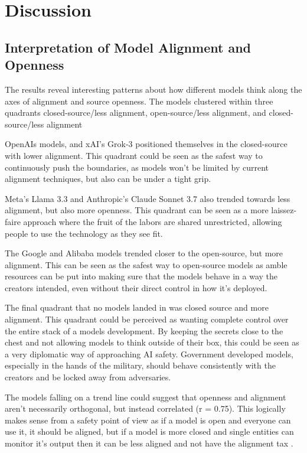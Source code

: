 \section{Discussion}

\subsection{Interpretation of Model Alignment and Openness}

The results reveal interesting patterns about how different models think along the axes of alignment and source openness. The models clustered within three quadrants closed-source/less alignment, open-source/less alignment, and closed-source/less alignment

OpenAIs models, and xAI's Grok-3 positioned themselves in the closed-source with lower alignment. This quadrant could be seen as the safest way to continuously push the boundaries, as models won't be limited by current alignment techniques, but also can be under a tight grip. 

Meta's Llama 3.3 and Anthropic's Claude Sonnet 3.7 also trended towards less alignment, but also more openness. This quadrant can be seen as a more laissez-faire approach where the fruit of the labors are shared unrestricted, allowing people to use the technology as they see fit. 

The Google and Alibaba models trended closer to the open-source, but more alignment. This can be seen as the safest way to open-source models as amble resources can be put into making sure that the models behave in a way the creators intended, even without their direct control in how it's deployed.

The final quadrant that no models landed in was closed source and more alignment. This quadrant could be perceived as wanting complete control over the entire stack of a models development. By keeping the secrets close to the chest and not allowing models to think outside of their box, this could be seen as a very diplomatic way of approaching AI safety. Government developed models, especially in the hands of the military, should behave consistently with the creators and be locked away from adversaries.

The models falling on a trend line could suggest that openness and alignment aren't necessarily orthogonal, but instead correlated (r = 0.75). This logically makes sense from a safety point of view as if a model is open and everyone can use it, it should be aligned, but if a model is more closed and single entities can monitor it's output then it can be less aligned and not have the alignment tax \citep{lin_mitigating_2024}.

